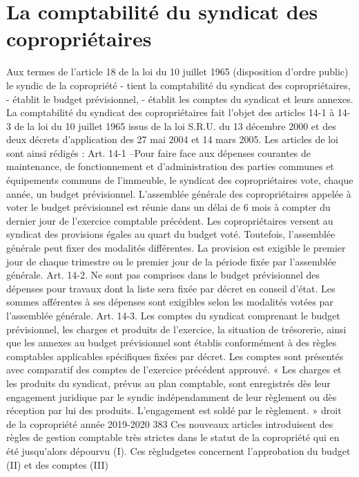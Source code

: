 \chapter{La comptabilité du syndicat des copropriétaires}

Aux termes de l'article 18 de la loi du 10 juillet 1965 (disposition d'ordre public) le syndic de la copropriété
- tient la comptabilité du syndicat des copropriétaires,
- établit le budget prévisionnel,
- établit les comptes du syndicat et leurs annexes.
La comptabilité du syndicat des copropriétaires fait l'objet des articles 14-1 à 14-3 de la loi du 10 juillet 1965 issus de la loi S.R.U. du 13 décembre 2000 et des deux décrets d'application des 27 mai 2004 et 14 mars 2005.
Les articles de loi sont ainsi rédigés :
Art. 14-1 –Pour faire face aux dépenses courantes de maintenance, de fonctionnement et d'administration des parties communes et équipements communs de l'immeuble, le syndicat des copropriétaires vote, chaque année, un budget prévisionnel. L'assemblée générale des copropriétaires appelée à voter le budget prévisionnel est réunie dans un délai de 6 mois à compter du dernier jour de l'exercice comptable précédent.
Les copropriétaires versent au syndicat des provisions égales au quart du budget voté. Toutefois, l'assemblée générale peut fixer des modalités différentes.
La provision est exigible le premier jour de chaque trimestre ou le premier jour de la période fixée par l'assemblée générale.
Art. 14-2. Ne sont pas comprises dans le budget prévisionnel des dépenses pour travaux dont la liste sera fixée par décret en conseil d'état.
Les sommes afférentes à ses dépenses sont exigibles selon les modalités votées par l'assemblée générale.
Art. 14-3. Les comptes du syndicat comprenant le budget prévisionnel, les charges et produits de l’exercice, la situation de trésorerie, ainsi que les annexes au budget prévisionnel sont établis conformément à des règles comptables applicables spécifiques fixées par décret. Les comptes sont présentés avec comparatif des comptes de l’exercice précédent approuvé.
« Les charges et les produits du syndicat, prévus au plan comptable, sont enregistrés dès leur engagement juridique par le syndic indépendamment de leur règlement ou dès réception par lui des produits. L’engagement est soldé par le règlement. »
droit de la copropriété année 2019-2020
383
Ces nouveaux articles introduisent des règles de gestion comptable très strictes dans le statut de la copropriété qui en été jusqu’alors dépourvu (I). Ces règludgetes concernent l’approbation du budget (II) et des comptes (III)
